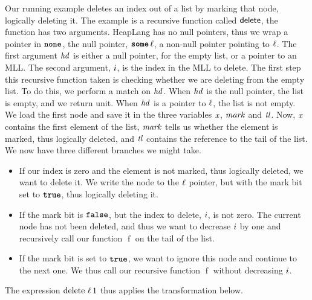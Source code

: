 \documentclass[thesis.tex]{subfiles}
\begin{document}
Our running example deletes an index out of a list by marking that node, logically deleting it.
\MLLDeleteProg
The example is a recursive function called $\textsf{\upshape delete}$, the function has two arguments. HeapLang has no null pointers, thus we wrap a pointer in $\operatorname{\texttt{\upshape \bfseries none}}$, the null pointer, $\operatorname{\texttt{\upshape \bfseries some}} \ell$, a non-null pointer pointing to $\ell$. The first argument $\mathit{hd}$ is either a null pointer, for the empty list, or a pointer to an MLL. The second argument, $i$, is the index in the MLL to delete. The first step this recursive function taken is checking whether we are deleting from the empty list. To do this, we perform a match on $\mathit{hd}$. When $\mathit{hd}$ is the null pointer, the list is empty, and we return unit. When $\mathit{hd}$ is a pointer to $\ell$, the list is not empty. We load the first node and save it in the three variables $\mathit{x}$, $\mathit{mark}$ and $\mathit{tl}$. Now, $\mathit{x}$ contains the first element of the list, $\mathit{mark}$ tells us whether the element is marked, thus logically deleted, and $\mathit{tl}$ contains the reference to the tail of the list. We now have three different branches we might take.
\begin{itemize}
    \item If our index is zero and the element is not marked, thus logically deleted, we want to delete it. We write the node to the $\ell$ pointer, but with the mark bit set to $\texttt{\upshape \bfseries true}$, thus logically deleting it.
    \item If the mark bit is $\texttt{\upshape \bfseries false}$, but the index to delete, $i$, is not zero. The current node has not been deleted, and thus we want to decrease $i$ by one and recursively call our function $\operatorname{f}$ on the tail of the list.
    \item If the mark bit is set to $\texttt{\upshape \bfseries true}$, we want to ignore this node and continue to the next one. We thus call our recursive function $\operatorname{f}$ without decreasing $i$.
\end{itemize}
The expression $\operatorname{delete}\, \ell\, 1$ thus applies the transformation below.
\end{document}
